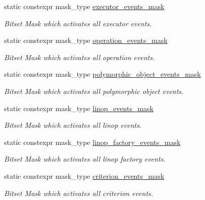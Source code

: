 \begin{DoxyCompactItemize}
\item 
static constexpr mask\+\_\+type \hyperlink{classgko_1_1log_1_1Logger_af263708ebb15007bc0086e7c438c190c}{executor\+\_\+events\+\_\+mask}
\begin{DoxyCompactList}\small\item\em Bitset Mask which activates all executor events. \end{DoxyCompactList}\item 
static constexpr mask\+\_\+type \hyperlink{classgko_1_1log_1_1Logger_a179f3d3ac86782922cbc63e33272840a}{operation\+\_\+events\+\_\+mask}
\begin{DoxyCompactList}\small\item\em Bitset Mask which activates all operation events. \end{DoxyCompactList}\item 
static constexpr mask\+\_\+type \hyperlink{classgko_1_1log_1_1Logger_a5fb997f1c06c0602103d8dab616a96bc}{polymorphic\+\_\+object\+\_\+events\+\_\+mask}
\begin{DoxyCompactList}\small\item\em Bitset Mask which activates all polymorphic object events. \end{DoxyCompactList}\item 
static constexpr mask\+\_\+type \hyperlink{classgko_1_1log_1_1Logger_a3e75086ec35aea9d9c0ade7774bfc1ba}{linop\+\_\+events\+\_\+mask}
\begin{DoxyCompactList}\small\item\em Bitset Mask which activates all linop events. \end{DoxyCompactList}\item 
static constexpr mask\+\_\+type \hyperlink{classgko_1_1log_1_1Logger_ad6fb77d4d5610bc7299087f7149a7f16}{linop\+\_\+factory\+\_\+events\+\_\+mask}
\begin{DoxyCompactList}\small\item\em Bitset Mask which activates all linop factory events. \end{DoxyCompactList}\item 
static constexpr mask\+\_\+type \hyperlink{classgko_1_1log_1_1Logger_a7f4ac79625bd3f0287230236013f6048}{criterion\+\_\+events\+\_\+mask}
\begin{DoxyCompactList}\small\item\em Bitset Mask which activates all criterion events. \end{DoxyCompactList}\end{DoxyCompactItemize}


